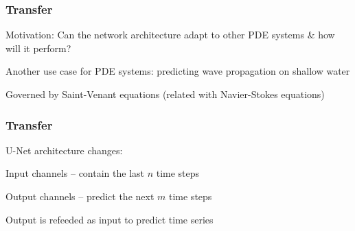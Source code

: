 \begin{frame}
    \frametitle{Transfer}
\vspace*{0.8cm}
Motivation: Can the network architecture adapt to other PDE systems \& how will it perform?

Another use case for PDE systems: predicting wave propagation on shallow water

Governed by Saint-Venant equations (related with Navier-Stokes equations)

\end{frame}
\clearpage

\begin{frame}
    \frametitle{Transfer}
\vspace*{0.8cm}

U-Net architecture changes:
\begin{PraesentationAufzaehlung}
    \item Input channels -- contain the last $n$ time steps
    \item Output channels -- predict the next $m$ time steps
    \item Output is refeeded as input to predict time series
\end{PraesentationAufzaehlung}

\end{frame}
\clearpage

